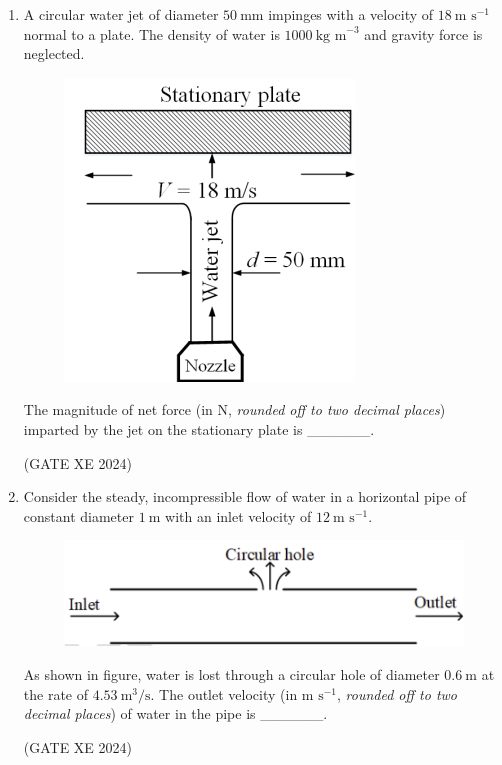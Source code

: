 \documentclass[12pt]{article}
\begin{document}
\begin{enumerate}
(GATE XE 2024)

\item A circular water jet of diameter $50\ \text{mm}$ impinges with a velocity of $18\ \text{m s}^{-1}$ normal to a plate. The density of water is $1000\ \text{kg m}^{-3}$ and gravity force is neglected.

\begin{figure}[H]
    \centering
    \includegraphics[width=0.5\columnwidth]{figs/ass5_b_q38.png}
    \caption{}
    \label{fig:placeholder}
\end{figure}

The magnitude of net force (in N, \emph{rounded off to two decimal places}) imparted by the jet on the stationary plate is \_\_\_\_\_\_. 

(GATE XE 2024)

\item Consider the steady, incompressible flow of water in a horizontal pipe of constant diameter $1\ \text{m}$ with an inlet velocity of $12\ \text{m s}^{-1}$. 

\begin{figure}[H]
    \centering
    \includegraphics[width=0.5\columnwidth]{figs/ass5_b_q39.png}
    \caption{}
    \label{fig:placeholder}
\end{figure}

As shown in figure, water is lost through a circular hole of diameter $0.6\ \text{m}$ at the rate of $4.53\ \text{m}^3\text{/s}$.
The outlet velocity (in $\text{m s}^{-1}$, \emph{rounded off to two decimal places}) of water in the pipe is \_\_\_\_\_\_. 

(GATE XE 2024)


\end{enumerate}
\end{document}
